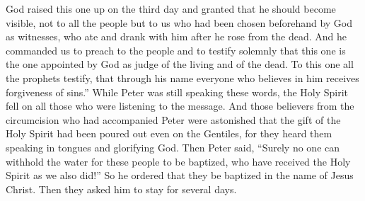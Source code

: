 \begin{biblechapter}
\verse God raised this one up on the third day and granted that he should become visible,
\verse not to all the people but to us who had been chosen beforehand by God as witnesses, who ate and drank with him after he rose from the dead.
\verse And he commanded us to preach to the people and to testify solemnly that this one is the one appointed by God as judge of the living and of the dead.
\verse To this one all the prophets testify, that through his name everyone who believes in him receives forgiveness of sins.”
 While Peter was still speaking these words, the Holy Spirit fell on all those who were listening to the message.
\verse And those believers from the circumcision who had accompanied Peter were astonished that the gift of the Holy Spirit had been poured out even on the Gentiles,
\verse for they heard them speaking in tongues and glorifying God. Then Peter said,
\verse “Surely no one can withhold the water for these people to be baptized, who have received the Holy Spirit as we also did!”
\verse So he ordered that they be baptized in the name of Jesus Christ. Then they asked him to stay for several days.
\end{biblechapter}


